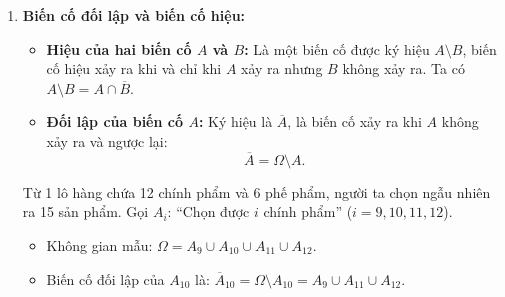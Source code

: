 \begin{enumerate}[label=\alph*), leftmargin=1.5em]
    \begin{vidu}
    Một người thợ săn bắn 2 viên đạn vào một con thú và con thú sẽ chết nếu nó bị trúng cả hai viên đạn.
    Gọi $A_i$: ``Viên đạn thứ $i$ trúng con thú'' ($i = 1, 2$);
    $A$: ``Con thú bị trúng đạn'';
    $B$: ``Con thú bị chết''.\\
    Khi đó: $A = A_1 \cup A_2$ và $B = A_1 \cap A_2 = A_1 A_2$.
    \end{vidu}

    \begin{vidu}
    Xét phép thử gieo hai hạt lúa.
    Gọi $N_i$: ``Hạt lúa thứ $i$ nảy mầm''; $K_i$: ``Hạt lúa thứ $i$ không nảy mầm'' ($i = 1, 2$).
    Gọi $A$: ``Có đúng 1 hạt lúa nảy mầm''.
    \begin{itemize}
        \item Không gian mẫu: $\Omega = \{K_1 K_2,\ N_1 K_2,\ K_1 N_2,\ N_1 N_2\}$.
        \item Các biến cố sơ cấp: $\omega_1 = K_1 K_2,\ \omega_2 = N_1 K_2,\ \omega_3 = K_1 N_2,\ \omega_4 = N_1 N_2$.
        \item Biến cố $A = N_1 K_2 \cup K_1 N_2$ không phải là biến cố sơ cấp.
    \end{itemize}
    \end{vidu}

    \item \textbf{Biến cố đối lập và biến cố hiệu:}
    \begin{itemize}
        \item \textbf{Hiệu của hai biến cố $A$ và $B$:} Là một biến cố được ký hiệu $A \setminus B$, biến cố hiệu xảy ra khi và chỉ khi $A$ xảy ra nhưng $B$ không xảy ra. Ta có $A \setminus B = A \cap \overline{B}$.
        \item \textbf{Đối lập của biến cố $A$:} Ký hiệu là $\overline{A}$, là biến cố xảy ra khi $A$ không xảy ra và ngược lại:
        \[
        \overline{A} = \Omega \setminus A.
        \]
    \end{itemize}

    \begin{vidu}
    Từ 1 lô hàng chứa 12 chính phẩm và 6 phế phẩm, người ta chọn ngẫu nhiên ra 15 sản phẩm.
    Gọi $A_i$: ``Chọn được $i$ chính phẩm'' ($i = 9, 10, 11, 12$).
    \begin{itemize}
        \item Không gian mẫu: $\Omega = A_9 \cup A_{10} \cup A_{11} \cup A_{12}$.
        \item Biến cố đối lập của $A_{10}$ là: $\overline{A}_{10} = \Omega \setminus A_{10} = A_9 \cup A_{11} \cup A_{12}$.
    \end{itemize}
    \end{vidu}
\end{enumerate}

